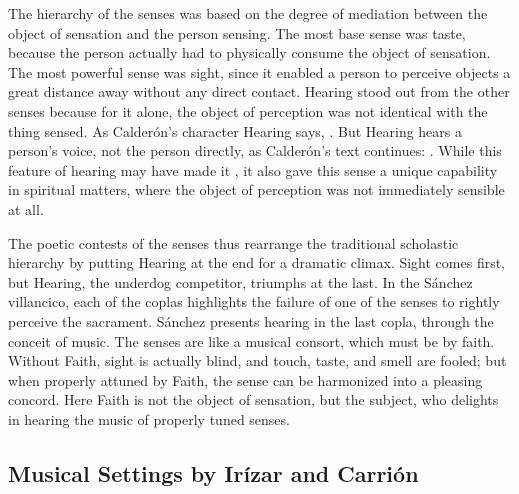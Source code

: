 The hierarchy of the senses was based on the degree of mediation between the object of sensation and the person sensing.
The most base sense was taste, because the person actually had to physically consume the object of sensation.
The most powerful sense was sight, since it enabled a person to perceive objects a great distance away without any direct contact.
Hearing stood out from the other senses because for it alone, the object of perception was not identical with the thing sensed.
As Calderón's character Hearing says, .%
\autocite[]{Calderon:Retiro}
But Hearing hears a person's voice, not the person directly, as Calderón's text continues: .%
\autocite[]{Calderon:Retiro}
While this feature of hearing may have made it , it also gave this sense a unique capability in spiritual matters, where the object of perception was not immediately sensible at all.

The poetic contests of the senses thus rearrange the traditional scholastic hierarchy by putting Hearing at the end for a dramatic climax.
Sight comes first, but Hearing, the underdog competitor, triumphs at the last.
In the Sánchez villancico, each of the coplas highlights the failure of one of the senses to rightly perceive the sacrament.
Sánchez presents hearing in the last copla, through the conceit of music.
The senses are  like a musical consort, which must be  by faith.
Without Faith, sight is actually blind, and touch, taste, and smell are fooled; but when properly attuned by Faith, the sense can be harmonized into a pleasing concord.
Here Faith is not the object of sensation, but the subject, who delights in hearing the music of properly tuned senses.

\subsection{Musical Settings by Irízar and Carrión}

